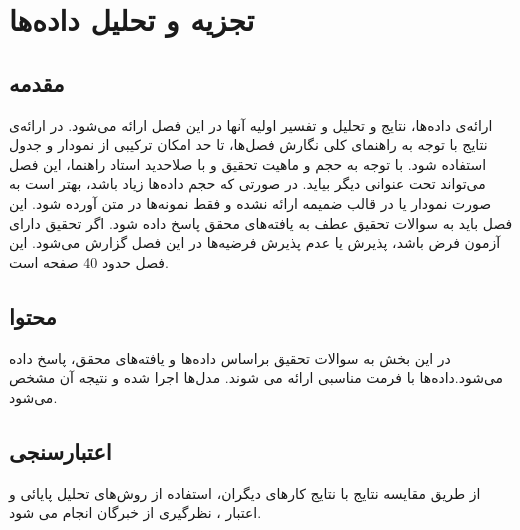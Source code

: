 \mainchapterstyle
\chapter{تجزیه و تحلیل داده‌ها}
\pagestyle{mainheader}


\section{مقدمه}
ارائه‌ی داده‌ها، نتایج و تحلیل و تفسیر اولیه آنها در این فصل ارائه می‌شود. در ارائه‌ی نتایج با توجه به
راهنمای کلی نگارش فصل‌ها، تا حد امکان ترکیبی از نمودار و جدول استفاده شود. با توجه به حجم و ماهیت
تحقیق و با صلاحدید استاد راهنما، این فصل می‌تواند تحت عنوانی دیگر بیاید. در صورتی که حجم داده‌ها زیاد
باشد، بهتر است به صورت نمودار یا در قالب ضمیمه ارائه نشده و فقط نمونه‌ها در متن آورده شود. این فصل
باید به سوالات تحقیق عطف به یافته‌های محقق پاسخ داده شود. اگر تحقیق دارای آزمون فرض باشد، پذیرش
یا عدم پذیرش فرضیه‌ها در این فصل گزارش می‌شود. این فصل حدود 40 صفحه است.

\section{محتوا}
در این بخش به سوالات تحقیق براساس داده‌ها و یافته‌های محقق، پاسخ داده می‌شود.داده‌ها با فرمت
مناسبی ارائه می شوند. مدل‌ها اجرا شده و نتیجه آن مشخص می‌شود.

\section{اعتبارسنجی}
از طریق مقایسه نتایج با نتایج کارهای دیگران، استفاده از روش‌های تحلیل پایائی و اعتبار ، نظرگیری از
خبرگان انجام می شود.

